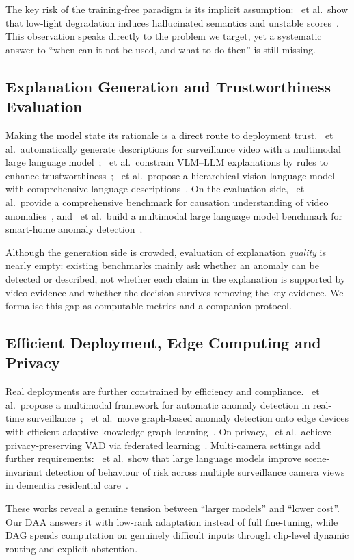 The key risk of the training-free paradigm is its implicit assumption: \citeauthor{mo2026lowlight}~et al.\ show that low-light degradation induces hallucinated semantics and unstable scores~\cite{mo2026lowlight}. This observation speaks directly to the problem we target, yet a systematic answer to ``when can it not be used, and what to do then'' is still missing.

\subsection{Explanation Generation and Trustworthiness Evaluation}

Making the model state its rationale is a direct route to deployment trust. \citeauthor{hashimoto2025caption}~et al.\ automatically generate descriptions for surveillance video with a multimodal large language model~\cite{hashimoto2025caption}; \citeauthor{khedher2025trustworthy}~et al.\ constrain VLM--LLM explanations by rules to enhance trustworthiness~\cite{khedher2025trustworthy}; \citeauthor{alradi2026hierarchical}~et al.\ propose a hierarchical vision-language model with comprehensive language descriptions~\cite{alradi2026hierarchical}. On the evaluation side, \citeauthor{du2024causation}~et al.\ provide a comprehensive benchmark for causation understanding of video anomalies~\cite{du2024causation}, and \citeauthor{zhao2025smarthomebench}~et al.\ build a multimodal large language model benchmark for smart-home anomaly detection~\cite{zhao2025smarthomebench}.

Although the generation side is crowded, evaluation of explanation \emph{quality} is nearly empty: existing benchmarks mainly ask whether an anomaly can be detected or described, not whether each claim in the explanation is supported by video evidence and whether the decision survives removing the key evidence. We formalise this gap as computable metrics and a companion protocol.

\subsection{Efficient Deployment, Edge Computing and Privacy}

Real deployments are further constrained by efficiency and compliance. \citeauthor{phan2025aadcnet}~et al.\ propose a multimodal framework for automatic anomaly detection in real-time surveillance~\cite{phan2025aadcnet}; \citeauthor{yun2025edgegnn}~et al.\ move graph-based anomaly detection onto edge devices with efficient adaptive knowledge graph learning~\cite{yun2025edgegnn}. On privacy, \citeauthor{li2026federated}~et al.\ achieve privacy-preserving VAD via federated learning~\cite{li2026federated}. Multi-camera settings add further requirements: \citeauthor{mishra2026dementia}~et al.\ show that large language models improve scene-invariant detection of behaviour of risk across multiple surveillance camera views in dementia residential care~\cite{mishra2026dementia}.

These works reveal a genuine tension between ``larger models'' and ``lower cost''. Our DAA answers it with low-rank adaptation instead of full fine-tuning, while DAG spends computation on genuinely difficult inputs through clip-level dynamic routing and explicit abstention.
